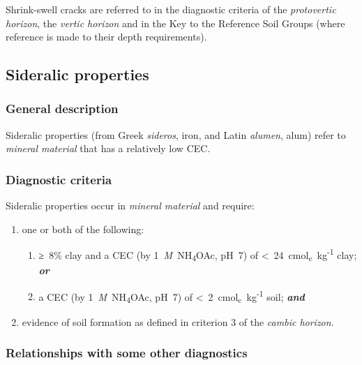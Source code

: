 \documentclass[
  letterpaper,
  DIV=11,
  numbers=noendperiod]{scrreprt}
\providecommand{\tightlist}{%
  \setlength{\itemsep}{0pt}\setlength{\parskip}{0pt}}\usepackage{longtable,booktabs,array}
\begin{document}
Shrink-swell cracks are referred to in the diagnostic criteria of the
\emph{protovertic horizon}, the \emph{vertic horizon} and in the Key to
the Reference Soil Groups (where reference is made to their depth
requirements).

\hypertarget{sideralic-properties}{%
\subsection{Sideralic properties}\label{sideralic-properties}}

\hypertarget{general-description-50}{%
\subsubsection{General description}\label{general-description-50}}

Sideralic properties (from Greek \emph{sideros}, iron, and Latin
\emph{alumen}, alum) refer to \emph{mineral material} that has a
relatively low CEC.

\hypertarget{diagnostic-criteria-52}{%
\subsubsection{Diagnostic criteria}\label{diagnostic-criteria-52}}

Sideralic properties occur in \emph{mineral material} and require:

\begin{enumerate}
\def\labelenumi{\arabic{enumi}.}
\item
  one or both of the following:

  \begin{enumerate}
  \def\labelenumii{\alph{enumii}.}
  \tightlist
  \item
    ≥~8\% clay and a CEC (by 1~\emph{M}~NH\textsubscript{4}OAc, pH~7) of
    \textless~24~cmol\textsubscript{c}~kg\textsuperscript{-1} clay;
    \textbf{\emph{or}}
  \item
    a CEC (by 1~\emph{M}~NH\textsubscript{4}OAc, pH~7) of
    \textless~2~cmol\textsubscript{c}~kg\textsuperscript{-1} soil;
    \textbf{\emph{and}}
  \end{enumerate}
\item
  evidence of soil formation as defined in criterion 3 of the
  \emph{cambic horizon}.
\end{enumerate}

\hypertarget{relationships-with-some-other-diagnostics-47}{%
\subsubsection{Relationships with some other
diagnostics}\label{relationships-with-some-other-diagnostics-47}}
\end{document}
